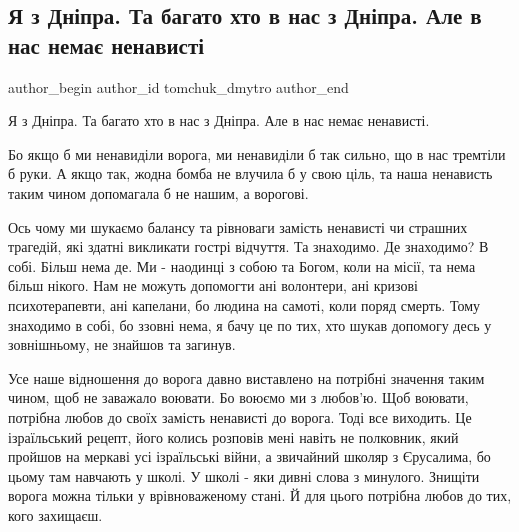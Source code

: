  
 
 
 
 

\subsection{Я з Дніпра. Та багато хто в нас з Дніпра. Але в нас немає ненависті}
\label{sec:16_01_2023.fb.tomchuk_dmytro.1.ya_z_dn_pra__ta_baga}

\ifcmt
 author_begin
   author_id tomchuk_dmytro
 author_end
\fi

Я з Дніпра. Та багато хто в нас з Дніпра. Але в нас немає ненависті.

Бо якщо б ми ненавиділи ворога, ми ненавиділи б так сильно, що в  нас тремтіли
б руки. А якщо так, жодна бомба не влучила б у свою ціль, та наша ненависть
таким чином допомагала б не нашим, а ворогові. 

Ось чому ми шукаємо балансу та рівноваги замість ненависті чи страшних
трагедій, які здатні викликати гострі відчуття. Та знаходимо. Де знаходимо? В
собі. Більш нема де. Ми - наодинці  з собою та Богом, коли на місії, та нема
більш нікого. Нам не можуть допомогти ані волонтери, ані кризові
психотерапевти, ані капелани, бо людина на самоті, коли поряд смерть. Тому
знаходимо в  собі, бо ззовні нема, я бачу це по тих, хто шукав допомогу десь у
зовнішньому, не знайшов та загинув.

Усе наше відношення до ворога давно виставлено на потрібні значення таким
чином, щоб не заважало воювати. Бо воюємо ми з любов'ю. Щоб воювати, потрібна
любов до своїх замість ненависті до ворога. Тоді все виходить. Це ізраїльський
рецепт, його колись розповів мені навіть не полковник, який пройшов на меркаві
усі ізраїльські війни,  а звичайний школяр з Єрусалима, бо цьому там навчають у
школі. У школі - яки дивні слова з минулого. Знищіти ворога можна тільки у
врівноваженому стані. Й для цього потрібна любов до тих, кого захищаєш. 

